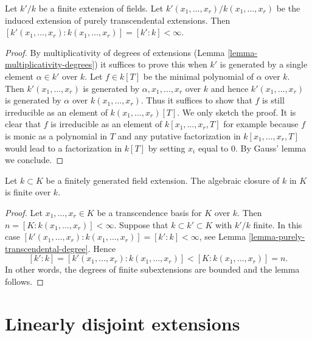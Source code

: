 \begin{lemma}
\label{lemma-purely-transcendental-degree}
Let $k'/k$ be a finite extension of fields. Let
$k'(x_1, \ldots, x_r)/k(x_1, \ldots, x_r)$ be the
induced extension of purely transcendental extensions.
Then $[k'(x_1, \ldots, x_r) : k(x_1, \ldots, x_r)] = [k' : k] < \infty$.
\end{lemma}

\begin{proof}
By multiplicativity of degrees of extensions
(Lemma \ref{lemma-multiplicativity-degrees})
it suffices to prove this when $k'$ is generated by a single element
$\alpha \in k'$ over $k$. Let $f \in k[T]$ be the minimal polynomial
of $\alpha$ over $k$. Then $k'(x_1, \ldots, x_r)$ is generated
by $\alpha, x_1, \ldots, x_r$ over $k$ and hence $k'(x_1, \ldots, x_r)$
is generated by $\alpha$ over $k(x_1, \ldots, x_r)$.
Thus it suffices to show that $f$ is still irreducible as
an element of $k(x_1, \ldots, x_r)[T]$. We only sketch the proof.
It is clear that $f$ is irreducible as an element of
$k[x_1, \ldots, x_r, T]$ for example because $f$ is monic
as a polynomial in $T$ and any putative factorization in
$k[x_1, \ldots, x_r, T]$ would lead to a factorization in $k[T]$
by setting $x_i$ equal to $0$. By Gauss' lemma we conclude.
\end{proof}

\begin{lemma}
\label{lemma-algebraic-closure-in-finitely-generated}
Let $k \subset K$ be a finitely generated field extension.
The algebraic closure of $k$ in $K$ is finite over $k$.
\end{lemma}

\begin{proof}
Let $x_1, \ldots, x_r \in K$ be a transcendence basis for $K$
over $k$. Then $n = [K : k(x_1, \ldots, x_r)] < \infty$.
Suppose that $k \subset k' \subset K$ with $k'/k$ finite.
In this case
$[k'(x_1, \ldots, x_r) : k(x_1, \ldots, x_r)] = [k' : k] < \infty$, see
Lemma \ref{lemma-purely-transcendental-degree}.
Hence
$$
[k' : k] = [k'(x_1, \ldots, x_r) : k(x_1, \ldots, x_r)]
< [K : k(x_1, \ldots, x_r)] = n.
$$
In other words, the degrees of finite subextensions are bounded
and the lemma follows.
\end{proof}






\section{Linearly disjoint extensions}
\label{section-linearly-disjoint}


